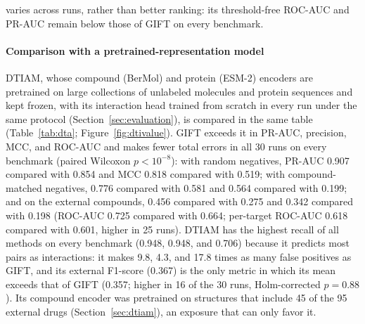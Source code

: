 \documentclass[11pt,letterpaper]{article}
\begin{document}
varies across runs, rather than better ranking: its threshold-free ROC-AUC and PR-AUC remain below those of GIFT on every benchmark.

\paragraph{Comparison with a pretrained-representation model}
DTIAM, whose compound (BerMol) and protein (ESM-2) encoders are pretrained on large collections of unlabeled molecules and protein sequences and kept frozen, with its interaction head trained from scratch in every run under the same protocol (Section~\ref{sec:evaluation}), is compared in the same table (Table~\ref{tab:dta}; Figure~\ref{fig:dtivalue}). GIFT exceeds it in PR-AUC, precision, MCC, and ROC-AUC and makes fewer total errors in all 30 runs on every benchmark (paired Wilcoxon $p<10^{-8}$): with random negatives, PR-AUC 0.907 compared with 0.854 and MCC 0.818 compared with 0.519; with compound-matched negatives, 0.776 compared with 0.581 and 0.564 compared with 0.199; and on the external compounds, 0.456 compared with 0.275 and 0.342 compared with 0.198 (ROC-AUC 0.725 compared with 0.664; per-target ROC-AUC 0.618 compared with 0.601, higher in 25 runs). DTIAM has the highest recall of all methods on every benchmark (0.948, 0.948, and 0.706) because it predicts most pairs as interactions: it makes 9.8, 4.3, and 17.8 times as many false positives as GIFT, and its external F1-score (0.367) is the only metric in which its mean exceeds that of GIFT (0.357; higher in 16 of the 30 runs, Holm-corrected $p=0.88$). Its compound encoder was pretrained on structures that include 45 of the 95 external drugs (Section~\ref{sec:dtiam}), an exposure that can only favor it.
\end{document}
